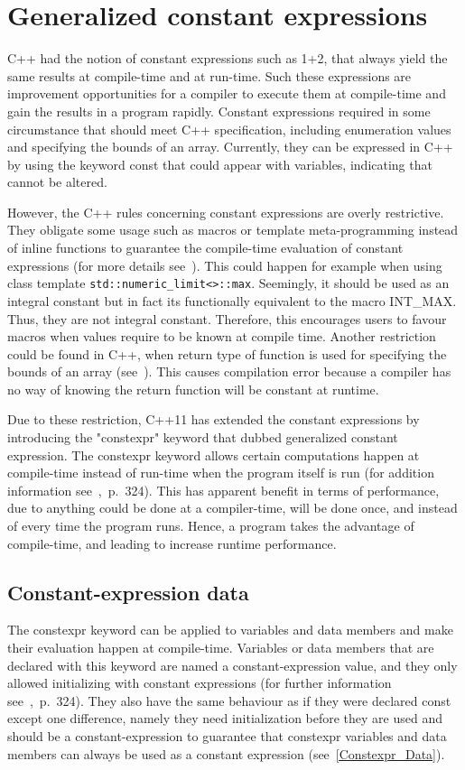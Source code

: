 \documentclass[11pt]{report}
\begin{document}
\section{Generalized constant expressions}
\label{section: Generalized constant expressions}
C++ had the notion of constant expressions such as 1+2, that always yield the same results at compile-time and at run-time. Such these expressions are improvement opportunities for a compiler to execute them at compile-time and gain the results in a program rapidly. Constant expressions required in some circumstance that should meet C++ specification, including enumeration values and specifying the bounds of an array. Currently, they can be expressed in C++ by using the keyword const that could appear with variables, indicating that cannot be altered.

However, the C++ rules concerning constant expressions are overly restrictive. They obligate some usage such as macros or template meta-programming instead of inline functions to guarantee the compile-time evaluation of constant expressions (for more details see~\cite{Stroustrup:2012:Cpp11}). This could happen for example when using class template \texttt{std::numeric\_limit<>::max}. Seemingly, it should be used as an integral constant but in fact its functionally equivalent to the macro INT\_MAX. Thus, they are not integral constant. Therefore, this encourages users to favour macros when values require to be known at compile time. Another restriction could be found in C++, when return type of function is used for specifying the bounds of an array (see~\cite{Stroustrup:2012:Cpp11}). This causes compilation error because a compiler has no way of knowing the return function will be constant at runtime.

Due to these restriction, C++11 has extended the constant expressions by introducing the "constexpr" keyword that dubbed generalized constant expression. The constexpr keyword allows certain computations happen at compile-time instead of run-time when the program itself is run (for addition information see~\cite{Williams:2012:CCA},~p.~324). This has apparent benefit in terms of performance, due to anything could be done at a compiler-time, will be done once, and instead of every time the program runs. Hence, a program takes the advantage of compile-time, and leading to increase runtime performance.

\subsection{Constant-expression data}
\label{subsection: constant-expression data}
The constexpr keyword can be applied to variables and data members and make their evaluation happen at compile-time. Variables or data members that are declared with this keyword are named a constant-expression value, and they only allowed initializing with constant expressions (for further information see~\cite{Williams:2012:CCA},~p.~324). They also have the same behaviour as if they were declared const except one difference, namely they need initialization before they are used and should be a constant-expression to guarantee that constexpr variables and data members can always be used as a constant expression (see~\ref{Constexpr_Data}). 
\end{document}
